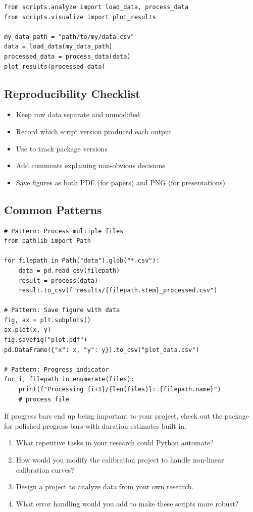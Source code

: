 \begin{lstlisting}
from scripts.analyze import load_data, process_data
from scripts.visualize import plot_results

my_data_path = "path/to/my/data.csv"
data = load_data(my_data_path)
processed_data = process_data(data)
plot_results(processed_data)
\end{lstlisting}

\subsection{Reproducibility Checklist}

\begin{itemize}
    \item Keep raw data separate and unmodified
    \item Record which script version produced each output
    \item Use  to track package versions
    \item Add comments explaining non-obvious decisions
    \item Save figures as both PDF (for papers) and PNG (for presentations)
\end{itemize}

\subsection{Common Patterns}

\begin{lstlisting}
# Pattern: Process multiple files
from pathlib import Path

for filepath in Path("data").glob("*.csv"):
    data = pd.read_csv(filepath)
    result = process(data)
    result.to_csv(f"results/{filepath.stem}_processed.csv")

# Pattern: Save figure with data
fig, ax = plt.subplots()
ax.plot(x, y)
fig.savefig("plot.pdf")
pd.DataFrame({"x": x, "y": y}).to_csv("plot_data.csv")

# Pattern: Progress indicator
for i, filepath in enumerate(files):
    print(f"Processing {i+1}/{len(files)}: {filepath.name}")
    # process file
\end{lstlisting}

\begin{tip}
If progress bars end up being important to your project, check out the package  for polished progress bars with duration estimates built in.
\end{tip}

\begin{ponder}
\begin{enumerate}
    \item What repetitive tasks in your research could Python automate?
    \item How would you modify the calibration project to handle non-linear calibration curves?
    \item Design a project to analyze data from your own research.
    \item What error handling would you add to make these scripts more robust?
\end{enumerate}
\end{ponder}
